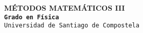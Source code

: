 \documentclass[a4paper,20pt]{article}
\begin{document}
\begin{center}

{\Huge \bf MÉTODOS MATEMÁTICOS III}\\[1cm]  %
{\large \tt {\tt \bf Grado en Física}\\  
Universidad de Santiago de Compostela}

\end{center}
\end{document}
